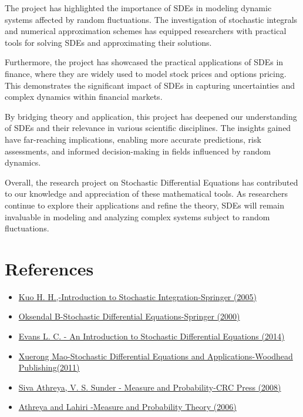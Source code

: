 \documentclass[twoside,final]{hcmut-report}
\begin{document}
The project has highlighted the importance of SDEs in modeling dynamic systems affected by random fluctuations. The investigation of stochastic integrals and numerical approximation schemes has equipped researchers with practical tools for solving SDEs and approximating their solutions.

Furthermore, the project has showcased the practical applications of SDEs in finance, where they are widely used to model stock prices and options pricing. This demonstrates the significant impact of SDEs in capturing uncertainties and complex dynamics within financial markets.

By bridging theory and application, this project has deepened our understanding of SDEs and their relevance in various scientific disciplines. The insights gained have far-reaching implications, enabling more accurate predictions, risk assessments, and informed decision-making in fields influenced by random dynamics.

Overall, the research project on Stochastic Differential Equations has contributed to our knowledge and appreciation of these mathematical tools. As researchers continue to explore their applications and refine the theory, SDEs will remain invaluable in modeling and analyzing complex systems subject to random fluctuations.

\pagebreak
\section{References}

 \begin{itemize}
        \item \href{https://drive.google.com/file/d/1vRMD3PfWG5iZTjwdAeLyz3_fwPLslEyn/view?usp=drive_link}{Kuo H. H.,-Introduction to Stochastic Integration-Springer (2005)}
        \item \href{https://drive.google.com/file/d/1dDVWcERBHMOOmIBrovXGwt5KPLrIyRxC/view?usp=drive_link}{Oksendal B-Stochastic Differential Equations-Springer (2000)}
        \item \href{https://drive.google.com/file/d/1EiN6uab1nWAKvLPzE0VfQuoJ4vpF1bjM/view?usp=drive_link}{Evans L. C. - An Introduction to Stochastic Differential Equations (2014)}
        \item \href{https://drive.google.com/file/d/1xmvYTdusN2AgJ88izdlyRi1nP0L7RGdY/view?usp=drive_link}{Xuerong Mao-Stochastic Differential Equations and Applications-Woodhead Publishing(2011)}
        \item \href{https://drive.google.com/file/d/1pPIpvQBrxkK69bebNpvoupaZNODOAGIk/view?usp=drive_link}{Siva Athreya, V. S. Sunder - Measure and Probability-CRC Press (2008)}
    \item \href{https://www.dropbox.com/scl/fo/o18jjmcgnvwu23ye2wwba/h?dl=0&rlkey=0n9ibd9u21w8oykfg7hut3hyf}{Athreya and Lahiri -Measure and Probability Theory (2006)}
        
    \end{itemize}

\clearpage
\end{document}
